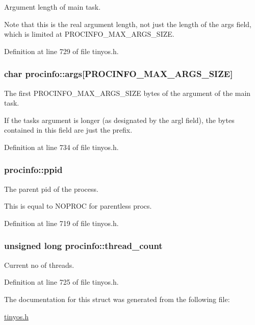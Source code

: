 Argument length of main task. 

Note that this is the real argument length, not just the length of the {\ttfamily args} field, which is limited at {\ttfamily P\+R\+O\+C\+I\+N\+F\+O\+\_\+\+M\+A\+X\+\_\+\+A\+R\+G\+S\+\_\+\+S\+I\+ZE}. 

Definition at line 729 of file tinyos.\+h.

\subsubsection[{\texorpdfstring{args}{args}}]{\setlength{\rightskip}{0pt plus 5cm}char procinfo\+::args\mbox{[}{\bf P\+R\+O\+C\+I\+N\+F\+O\+\_\+\+M\+A\+X\+\_\+\+A\+R\+G\+S\+\_\+\+S\+I\+ZE}\mbox{]}}\hypertarget{structprocinfo_ac812ea3215fafc8ced9f91320b2d3959}{}\label{structprocinfo_ac812ea3215fafc8ced9f91320b2d3959}


The first {\ttfamily P\+R\+O\+C\+I\+N\+F\+O\+\_\+\+M\+A\+X\+\_\+\+A\+R\+G\+S\+\_\+\+S\+I\+ZE} bytes of the argument of the main task. 

If the task\textquotesingle{}s argument is longer (as designated by the {\ttfamily argl} field), the bytes contained in this field are just the prefix. 

Definition at line 734 of file tinyos.\+h.

\subsubsection[{\texorpdfstring{ppid}{ppid}}]{ procinfo\+::ppid}\hypertarget{structprocinfo_a790970c70987013b2712b7dd6d2b75b9}{}\label{structprocinfo_a790970c70987013b2712b7dd6d2b75b9}


The parent pid of the process. 

This is equal to N\+O\+P\+R\+OC for parentless procs. 

Definition at line 719 of file tinyos.\+h.

\subsubsection[{\texorpdfstring{thread\+\_\+count}{thread_count}}]{\setlength{\rightskip}{0pt plus 5cm}unsigned long procinfo\+::thread\+\_\+count}\hypertarget{structprocinfo_ae1ed3afa8904729a1daf1b51780cf2cf}{}\label{structprocinfo_ae1ed3afa8904729a1daf1b51780cf2cf}
Current no of threads. 

Definition at line 725 of file tinyos.\+h.



The documentation for this struct was generated from the following file\+:\begin{DoxyCompactItemize}
\item 
\hyperlink{tinyos_8h}{tinyos.\+h}\end{DoxyCompactItemize}
